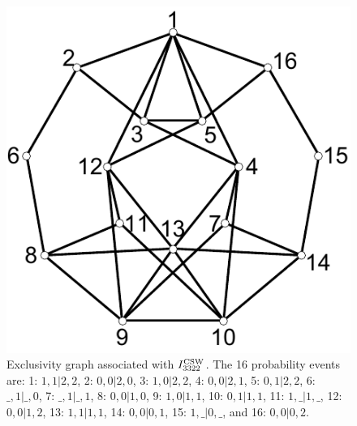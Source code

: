 \documentclass[prl,letterpaper,english,reprint,nofootinbib,aps,superscriptaddress,showpacs,showkeys]{revtex4-1}
\theoremstyle{definition}
\theoremstyle{remark}
\begin{document}
\begin{figure}[t]
\centering
\includegraphics[scale=0.6]{i3322.pdf}
\caption{\label{Fig7}Exclusivity graph associated with $I_{3322}^{\rm CSW}$.
The 16 probability events are:
 1: $1,1|2,2$,
 2: $0,0|2,0$,
 3: $1,0|2,2$,
 4: $0,0|2,1$,
 5: $0,1|2,2$,
 6: $\_,1|\_,0$,
 7: $\_,1|\_,1$,
 8: $0,0|1,0$,
 9: $1,0|1,1$,
10: $0,1|1,1$,
11: $1,\_|1,\_$,
12: $0,0|1,2$,
13: $1,1|1,1$,
14: $0,0|0,1$,
15: $1,\_|0,\_$, and
16: $0,0|0,2$.
}
\end{figure}
\end{document}
